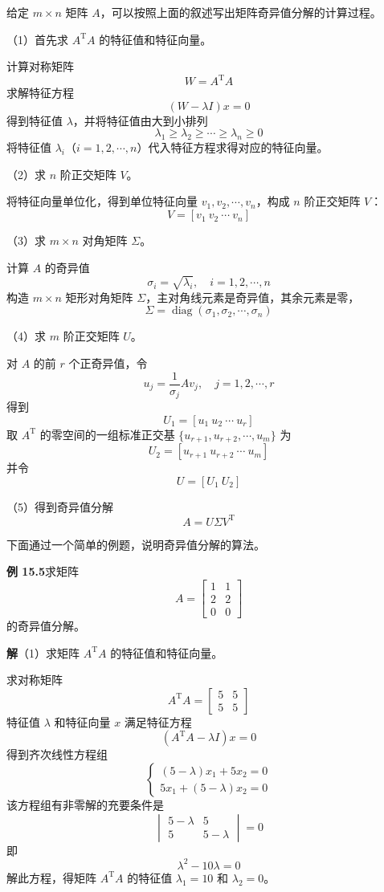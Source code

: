 \documentclass[UTF8,12pt,a4paper,fontset=fandol]{ctexart}
\begin{document}
给定 $m\times n$ 矩阵 $A$，可以按照上面的叙述写出矩阵奇异值分解的计算过程。

（1）首先求 $A^{\mathrm{T}}A$ 的特征值和特征向量。

计算对称矩阵
\[
W=A^{\mathrm{T}}A
\]
求解特征方程
\[
(W-\lambda I)x=0
\]
得到特征值 $\lambda$，并将特征值由大到小排列
\[
\lambda_1\geqslant\lambda_2\geqslant\cdots\geqslant\lambda_n\geqslant0
\]
将特征值 $\lambda_i$（$i=1,2,\cdots,n$）代入特征方程求得对应的特征向量。

（2）求 $n$ 阶正交矩阵 $V$。

将特征向量单位化，得到单位特征向量 $v_1,v_2,\cdots,v_n$，构成 $n$ 阶正交矩阵 $V$：
\[
V=[v_1\ v_2\ \cdots\ v_n]
\]

（3）求 $m\times n$ 对角矩阵 $\Sigma$。

计算 $A$ 的奇异值
\[
\sigma_i=\sqrt{\lambda_i},\quad i=1,2,\cdots,n
\]
构造 $m\times n$ 矩形对角矩阵 $\Sigma$，主对角线元素是奇异值，其余元素是零，
\[
\Sigma=\operatorname{diag}(\sigma_1,\sigma_2,\cdots,\sigma_n)
\]

（4）求 $m$ 阶正交矩阵 $U$。

对 $A$ 的前 $r$ 个正奇异值，令
\[
u_j=\frac{1}{\sigma_j}Av_j,\quad j=1,2,\cdots,r
\]
得到
\[
U_1=[u_1\ u_2\ \cdots\ u_r]
\]
取 $A^{\mathrm{T}}$ 的零空间的一组标准正交基 $\{u_{r+1},u_{r+2},\cdots,u_m\}$ 为
\[
U_2=[u_{r+1}\ u_{r+2}\ \cdots\ u_m]
\]
并令
\[
U=[U_1\ U_2]
\]

（5）得到奇异值分解
\[
A=U\Sigma V^{\mathrm{T}}
\]

下面通过一个简单的例题，说明奇异值分解的算法。

\noindent\textbf{例 15.5}\quad 求矩阵
\[
A=
\begin{bmatrix}
1&1\\
2&2\\
0&0
\end{bmatrix}
\]
的奇异值分解。

\noindent\textbf{解}\quad （1）求矩阵 $A^{\mathrm{T}}A$ 的特征值和特征向量。

求对称矩阵
\[
A^{\mathrm{T}}A=
\begin{bmatrix}
5&5\\
5&5
\end{bmatrix}
\]
特征值 $\lambda$ 和特征向量 $x$ 满足特征方程
\[
(A^{\mathrm{T}}A-\lambda I)x=0
\]
得到齐次线性方程组
\[
\begin{cases}
(5-\lambda)x_1+5x_2=0\\
5x_1+(5-\lambda)x_2=0
\end{cases}
\]
该方程组有非零解的充要条件是
\[
\begin{vmatrix}
5-\lambda&5\\
5&5-\lambda
\end{vmatrix}=0
\]
即
\[
\lambda^2-10\lambda=0
\]
解此方程，得矩阵 $A^{\mathrm{T}}A$ 的特征值 $\lambda_1=10$ 和 $\lambda_2=0$。
\end{document}
